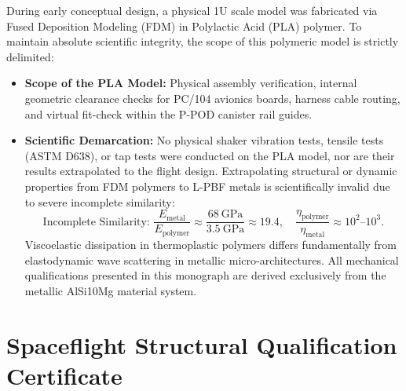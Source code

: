 During early conceptual design, a physical 1U scale model was fabricated via Fused Deposition Modeling (FDM) in Polylactic Acid (PLA) polymer. To maintain absolute scientific integrity, the scope of this polymeric model is strictly delimited:
\begin{itemize}
\item \textbf{Scope of the PLA Model:} Physical assembly verification, internal geometric clearance checks for PC/104 avionics boards, harness cable routing, and virtual fit-check within the P-POD canister rail guides.
\item \textbf{Scientific Demarcation:} No physical shaker vibration tests, tensile tests (ASTM D638), or tap tests were conducted on the PLA model, nor are their results extrapolated to the flight design. Extrapolating structural or dynamic properties from FDM polymers to L-PBF metals is scientifically invalid due to severe incomplete similarity:
  \begin{equation}
  \text{Incomplete Similarity: } \frac{E_{\text{metal}}}{E_{\text{polymer}}} \approx \frac{\SI{68}{\giga\pascal}}{\SI{3.5}{\giga\pascal}} \approx 19.4, \quad \frac{\eta_{\text{polymer}}}{\eta_{\text{metal}}} \approx 10^2\text{--}10^3.
  \end{equation}
  Viscoelastic dissipation in thermoplastic polymers differs fundamentally from elastodynamic wave scattering in metallic micro-architectures. All mechanical qualifications presented in this monograph are derived exclusively from the metallic AlSi10Mg material system.
\end{itemize}

\section{Spaceflight Structural Qualification Certificate}
\label{sec:qualification_certificate}

